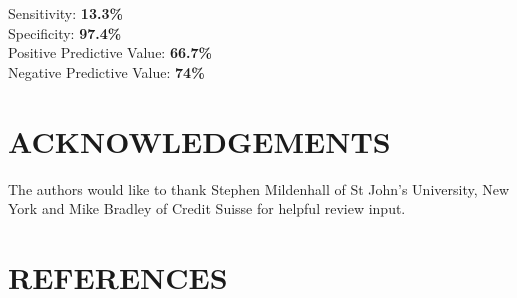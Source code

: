 \documentclass[
  letterpaper,
  DIV=11,
  numbers=noendperiod]{scrartcl}
\begin{document}
Sensitivity: \textbf{13.3\%}\\
Specificity: \textbf{97.4\%}\\
Positive Predictive Value: \textbf{66.7\%}\\
Negative Predictive Value: \textbf{74\%}

\section{ACKNOWLEDGEMENTS}\label{acknowledgements}

The authors would like to thank Stephen Mildenhall of St John's
University, New York and Mike Bradley of Credit Suisse for helpful
review input.

\section*{REFERENCES}\label{references}
\end{document}
